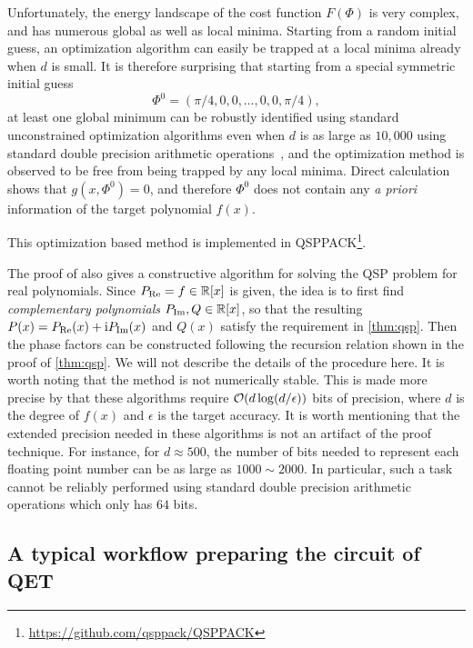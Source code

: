 Unfortunately, the energy landscape of the cost function $F(\Phi)$ is very complex, and has numerous global as well as local minima. Starting from a random initial guess, an optimization algorithm can easily be trapped at a local minima already when $d$ is small.
It is therefore surprising that starting from a special symmetric initial  guess
\begin{equation}\label{eqn:phi0}
\Phi^0=(\pi/4,0,0,\ldots, 0,0,\pi/4),
\end{equation}
at least one global minimum can be robustly identified using standard unconstrained optimization algorithms even when $d$ is as large as $10,000$ using standard double precision arithmetic operations~\cite{DongMengWhaleyEtAl2021}, and the optimization method is observed to be free from being trapped by any local minima.
Direct calculation shows that $g(x,\Phi^0)=0$, and therefore $\Phi^0$ does not contain any \emph{a priori} information of the target polynomial $f(x)$.


This optimization based method is implemented in QSPPACK\footnote{\url{https://github.com/qsppack/QSPPACK}}.

\begin{rem}
The proof of \cite[Corollary 5]{GilyenSuLowEtAl2019} also gives a constructive algorithm for solving the QSP problem for real polynomials. 
Since $P_{\operatorname{Re}}=f\in\mathbb{R}[x]$ is given, the idea is to first find \emph{complementary polynomials} $P_{\operatorname{Im}},Q\in\mathbb{R}[x]$, so that the resulting $P(x)=P_{\operatorname{Re}}(x)+\mathrm{i} P_{\operatorname{Im}}(x)$ and $Q(x)$ satisfy the requirement in \cref{thm:qsp}.
Then the phase factors can be constructed following the recursion relation shown in the proof of \cref{thm:qsp}. 
We will not describe the details of the procedure here. 
It is worth noting that the method is not numerically stable. 
This is made more precise by \cite{Haah2019} that these algorithms require $\mathcal{O}(d\log(d/\epsilon))$ bits of precision, where $d$ is the degree of $f(x)$ and $\epsilon$ is the target accuracy. 
It is worth mentioning that the extended precision needed in these algorithms is not an artifact of the proof technique. For instance, for $d\approx 500$, the number of bits needed to represent each floating point number can be as large as  $1000\sim 2000$.
In particular, such a task cannot be reliably performed using standard double precision arithmetic operations which only has $64$ bits.
\end{rem}


\subsection{A typical workflow preparing the circuit of QET}

